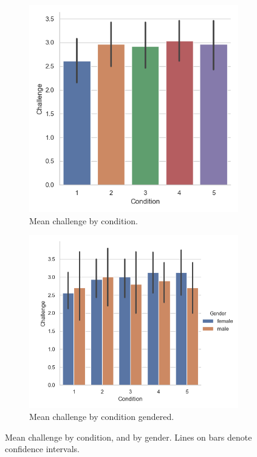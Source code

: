 \begin{figure}[H]
 \begin{subfigure}[b]{0.5\textwidth}
     \centering
     \includegraphics[scale=0.5]{Files/Plots/challenge_by_condition_mean.png}
     \caption{Mean challenge by condition.}
     \label{fig:meanChal}
 \end{subfigure}
  \begin{subfigure}[b]{0.5\textwidth}
     \centering
     \includegraphics[scale=0.5]{Files/Plots/challenge_by_condition_mean_gen.png}
     \caption{Mean challenge by condition gendered.}
     \label{fig:meanChalGen}
 \end{subfigure}
     \caption{Mean challenge by condition, and by gender. Lines on bars denote confidence intervals.}
    \label{fig:chalByCond}
\end{figure}
